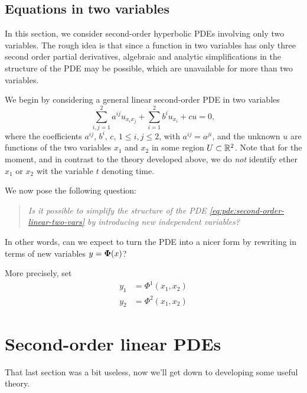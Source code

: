 \subsection{Equations in two variables}
In this section, we consider second-order hyperbolic PDEs involving only
two variables. The rough idea is that since a function in two variables has
only three second order partial derivatives, algebraic and analytic
simplifications in the structure of the PDE may be possible, which are
unavailable for more than two variables.

We begin by considering a general linear second-order PDE in two variables
\begin{equation}
  \label{eq:pde:second-order-linear-two-vars}
  \sum_{i,j=1}^2 a^{ij}u_{x_ix_j}+\sum_{i=1}^2 b^i u_{x_i}+cu=0,
\end{equation}
where the coefficients \(a^{ij}\), \(b^i\), \(c\), \(1\leq i,j\leq 2\),
with \(a^{ij}=a^{ji}\), and the unknown \(u\) are functions of the two
variables \(x_1\) and \(x_2\) in some region \(U\subset\mathbb{R}^2\). Note that
for the moment, and in contrast to the theory developed above, we do
\emph{not} identify ether \(x_1\) or \(x_2\) wit the variable \(t\)
denoting time.

We now pose the following question:
\begin{quote}
  \textsl{Is it possible to simplify the structure of the PDE
    \eqref{eq:pde:second-order-linear-two-vars} by introducing new
    independent variables?}
\end{quote}
In other words, can we expect to turn the PDE into a nicer form by
rewriting in terms of new variables \(y={\boldsymbol\Phi}(x)\)?

More precisely, set
\begin{equation}
  \label{eq:pde:second-order-linear-new-variables}
  \begin{aligned}
    y_1&=\Phi^1(x_1,x_2)\\
    y_2&=\Phi^2(x_1,x_2)
  \end{aligned}
\end{equation}

\section{Second-order linear PDEs}
That last section was a bit useless, now we'll get down to developing some
useful theory.

